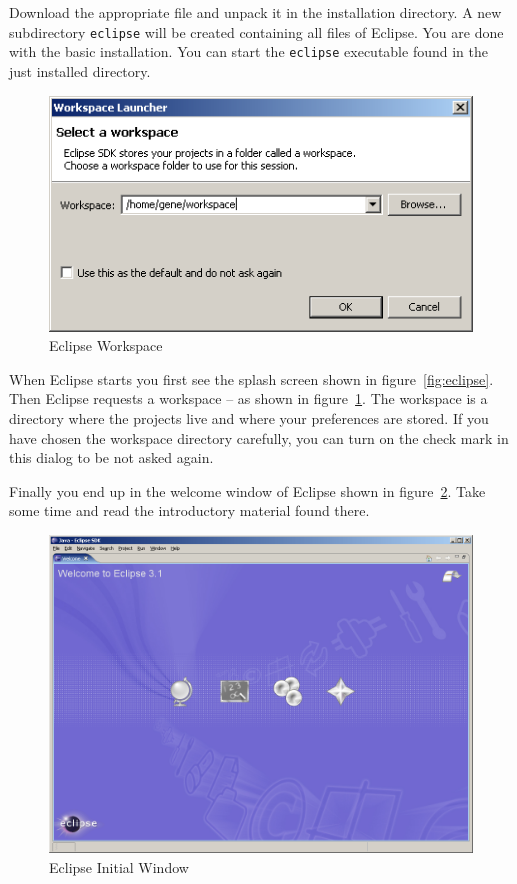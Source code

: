 Download the appropriate file and unpack it in the installation
directory. A new subdirectory \texttt{eclipse} will be created
containing all files of Eclipse. You are done with the basic
installation. You can start the \texttt{eclipse} executable found in
the just installed directory.

\begin{figure}[h]
  \centering  \includegraphics[scale=.5]{image/eclipse-workspace}
  \caption{Eclipse Workspace}\label{fig:eclipse-workspace}
\end{figure}
When Eclipse starts you first see the splash screen shown in
figure~\ref{fig:eclipse}. Then Eclipse requests a workspace -- as
shown in figure~\ref{fig:eclipse-workspace}. The workspace is a
directory where the projects live and where your preferences are
stored. If you have chosen the workspace directory carefully, you can
turn on the check mark in this dialog to be not asked again.

Finally you end up in the welcome window of Eclipse shown in
figure~\ref{fig:eclipse-welcome}. Take some time and read the
introductory material found there.
\begin{figure}[h]
  \centering  \includegraphics[scale=.33]{image/eclipse-welcome}
  \caption{Eclipse Initial Window}\label{fig:eclipse-welcome}
\end{figure}

